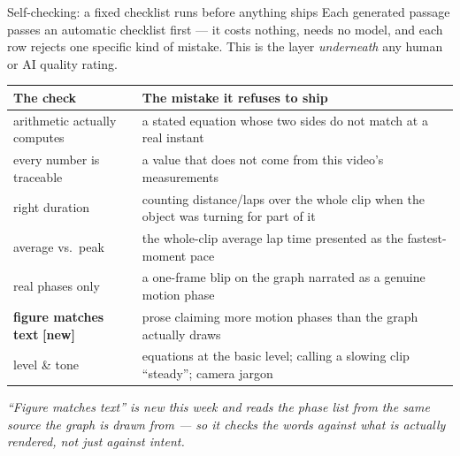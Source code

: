 \documentclass[aspectratio=169,10pt]{beamer}
\newcommand{\nw}{{\scriptsize\color{cAccent}\textbf{[new]}}}
\newcommand{\takeaway}[1]{\vfill{\footnotesize\itshape\color{cGrey}#1\par}}
\begin{document}
\begin{frame}{Self-checking: a fixed checklist runs before anything ships}
\small
Each generated passage passes an automatic checklist first --- it costs nothing, needs no model, and
each row rejects one specific kind of mistake. This is the layer \emph{underneath} any human or
AI quality rating.
\vspace{0.3em}
\scriptsize
\renewcommand{\arraystretch}{1.4}
\begin{tabular}{@{}p{4.9cm}p{7.7cm}@{}}
\toprule
\textbf{The check} & \textbf{The mistake it refuses to ship} \\
\midrule
arithmetic actually computes & a stated equation whose two sides do not match at a real instant \\
every number is traceable & a value that does not come from this video's measurements \\
right duration & counting distance/laps over the whole clip when the object was turning for part of it \\
average vs.\ peak & the whole-clip average lap time presented as the fastest-moment pace \\
real phases only & a one-frame blip on the graph narrated as a genuine motion phase \\
\rowcolor{cAccent!8}\textbf{figure matches text} \nw & prose claiming more motion phases than the graph actually draws \\
level \& tone & equations at the basic level; calling a slowing clip ``steady''; camera jargon \\
\bottomrule
\end{tabular}
\takeaway{``Figure matches text'' is new this week and reads the phase list from the \emph{same} source
the graph is drawn from --- so it checks the words against what is actually rendered, not just against
intent.}
\end{frame}
\end{document}
